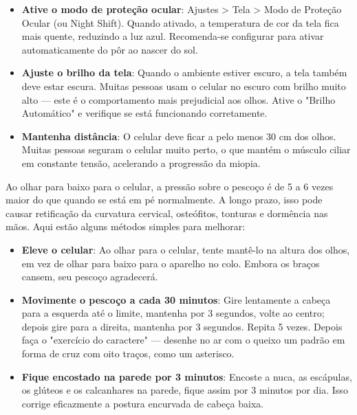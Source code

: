 \begin{itemize}
  \item \textbf{Ative o modo de proteção ocular}: Ajustes > Tela > Modo de Proteção Ocular (ou Night Shift). Quando ativado, a temperatura de cor da tela fica mais quente, reduzindo a luz azul. Recomenda-se configurar para ativar automaticamente do pôr ao nascer do sol.
  \item \textbf{Ajuste o brilho da tela}: Quando o ambiente estiver escuro, a tela também deve estar escura. Muitas pessoas usam o celular no escuro com brilho muito alto — este é o comportamento mais prejudicial aos olhos. Ative o "Brilho Automático" e verifique se está funcionando corretamente.
  \item \textbf{Mantenha distância}: O celular deve ficar a pelo menos 30 cm dos olhos. Muitas pessoas seguram o celular muito perto, o que mantém o músculo ciliar em constante tensão, acelerando a progressão da miopia.
\end{itemize}


Ao olhar para baixo para o celular, a pressão sobre o pescoço é de 5 a 6 vezes maior do que quando se está em pé normalmente. A longo prazo, isso pode causar retificação da curvatura cervical, osteófitos, tonturas e dormência nas mãos. Aqui estão alguns métodos simples para melhorar:

\begin{itemize}
  \item \textbf{Eleve o celular}: Ao olhar para o celular, tente mantê-lo na altura dos olhos, em vez de olhar para baixo para o aparelho no colo. Embora os braços cansem, seu pescoço agradecerá.
  \item \textbf{Movimente o pescoço a cada 30 minutos}: Gire lentamente a cabeça para a esquerda até o limite, mantenha por 3 segundos, volte ao centro; depois gire para a direita, mantenha por 3 segundos. Repita 5 vezes. Depois faça o "exercício do caractere" — desenhe no ar com o queixo um padrão em forma de cruz com oito traços, como um asterisco.
  \item \textbf{Fique encostado na parede por 3 minutos}: Encoste a nuca, as escápulas, os glúteos e os calcanhares na parede, fique assim por 3 minutos por dia. Isso corrige eficazmente a postura encurvada de cabeça baixa.
\end{itemize}


